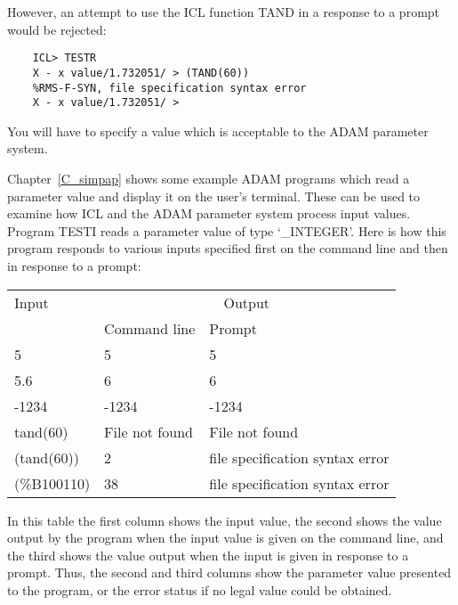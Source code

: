 However, an attempt to use the ICL function TAND in a response to a prompt
would be rejected:

\begin{small}
\begin{verbatim}
    ICL> TESTR
    X - x value/1.732051/ > (TAND(60))
    %RMS-F-SYN, file specification syntax error
    X - x value/1.732051/ >
\end{verbatim}
\end{small}

You will have to specify a value which is acceptable to the ADAM parameter
system.

Chapter~\ref{C_simpap} shows some example ADAM programs which read a
parameter value and display it on the user's terminal.
These can be used to examine how ICL and the ADAM parameter system process input
values.
Program TESTI reads a parameter value of type `\_INTEGER'.
Here is how this program responds to various inputs specified first on the
command line and then in response to a prompt:
\begin{center}
\begin{tabular}{|l|l|l|}
\hline
Input & \multicolumn{2}{c|}{Output} \\ \cline{2-3}
& Command line & Prompt \\
\hline
5 & 5 & 5 \\
5.6 & 6 & 6 \\
-1234 & -1234 & -1234 \\
tand(60) & File not found & File not found \\
(tand(60)) & 2 & file specification syntax error \\
(\%B100110) & 38 & file specification syntax error \\
\hline
\end{tabular}
\end{center}
In this table the first column shows the input value, the second shows the
value output by the program when the input value is given on the command
line, and the third shows the value output when the input is given in response
to a prompt.
Thus, the second and third columns show the parameter value presented to the
program, or the error status if no legal value could be obtained.

